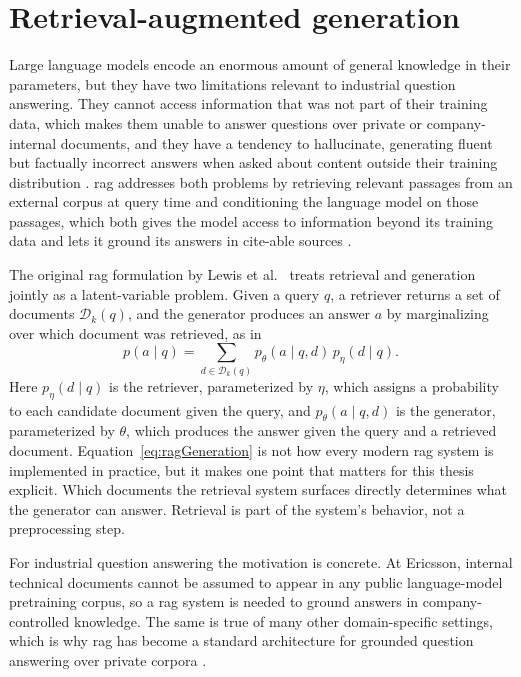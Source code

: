 \documentclass[english, bibtex]{kththesis}               %
\numberwithin{listing}{chapter}
\begin{document}
\section{Retrieval-augmented generation}
\label{sec:backgroundRag}

Large language models encode an enormous amount of general knowledge in their parameters, but they have two limitations relevant to industrial question answering. They cannot access information that was not part of their training data, which makes them unable to answer questions over private or company-internal documents, and they have a tendency to hallucinate, generating fluent but factually incorrect answers when asked about content outside their training distribution \cite{gao2023ragsurvey}. \Gls{rag} addresses both problems by retrieving relevant passages from an external corpus at query time and conditioning the language model on those passages, which both gives the model access to information beyond its training data and lets it ground its answers in cite-able sources \cite{lewis2020rag,gao2023ragsurvey}.

The original \gls{rag} formulation by Lewis et al.\ \cite{lewis2020rag} treats retrieval and generation jointly as a latent-variable problem. Given a query \(q\), a retriever returns a set of documents \(\mathcal{D}_k(q)\), and the generator produces an answer \(a\) by marginalizing over which document was retrieved, as in
\begin{equation}
\label{eq:ragGeneration}
p(a \mid q) =
\sum_{d \in \mathcal{D}_k(q)}
p_\theta(a \mid q,d)\,p_\eta(d \mid q).
\end{equation}
Here \(p_\eta(d \mid q)\) is the retriever, parameterized by \(\eta\), which assigns a probability to each candidate document given the query, and \(p_\theta(a \mid q, d)\) is the generator, parameterized by \(\theta\), which produces the answer given the query and a retrieved document. Equation~\ref{eq:ragGeneration} is not how every modern \gls{rag} system is implemented in practice, but it makes one point that matters for this thesis explicit. Which documents the retrieval system surfaces directly determines what the generator can answer. Retrieval is part of the system's behavior, not a preprocessing step.

For industrial question answering the motivation is concrete. At Ericsson, internal technical documents cannot be assumed to appear in any public language-model pretraining corpus, so a \gls{rag} system is needed to ground answers in company-controlled knowledge. The same is true of many other domain-specific settings, which is why \gls{rag} has become a standard architecture for grounded question answering over private corpora \cite{gao2023ragsurvey}.
\end{document}
